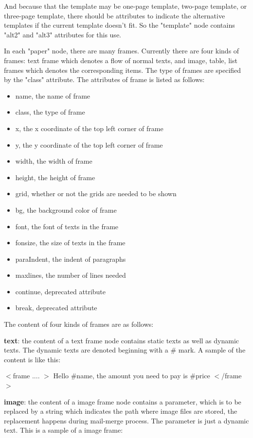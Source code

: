 \documentclass{report}
\begin{document}
  And because that the template may be one-page template, two-page template, or three-page template, there should be attributes to indicate the alternative templates if the current template doesn't fit. So the "template" node contains "alt2" and "alt3" attributes for this use.

  In each "paper" node, there are many frames. Currently there are four kinds of frames: text frame which denotes a flow of normal texts, and image, table, list frames which denotes the corresponding items. The type of frames are specified by the "class" attribute. The attributes of frame is listed as follows:

\begin{itemize}
\item name, the name of frame
\item class, the type of frame
\item x, the x coordinate of the top left corner of frame
\item y, the y coordinate of the top left corner of frame
\item width, the width of frame
\item height, the height of frame
\item grid, whether or not the grids are needed to be shown
\item bg, the background color of frame
\item font, the font of texts in the frame
\item fonsize, the size of texts in the frame
\item paraIndent, the indent of paragraphs
\item maxlines, the number of lines needed
\item continue, deprecated attribute
\item break, deprecated attribute
\end{itemize}

  The content of four kinds of frames are as follows:

  \textbf{text}: the content of a text frame node contains static texts as well as dynamic texts. The dynamic texts are denoted beginning with a \# mark. A sample of the content is like this: 

  $<$frame .... $>$ Hello \#name, the amount you need to pay is \#price $<$/frame$>$

  \textbf{image}: the content of a image frame node contains a parameter, which is to be replaced by a string which indicates the path where image files are stored, the replacement happens during mail-merge process. The parameter is just a dynamic text. This is a sample of a image frame:
\end{document}

